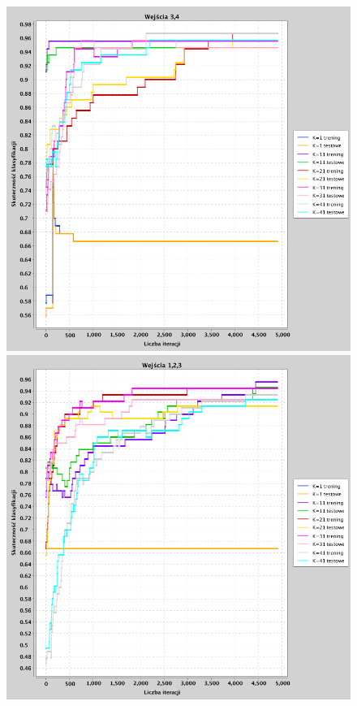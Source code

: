 \documentclass[a4paper, portrait,11pt]{article}
\begin{document}
\begin{figure}[!htb]
  \begin{minipage}{0.33\textwidth}
    \centering
    \includegraphics[width=1\linewidth]{../data/classification4/1/2_3,4.png}
    \caption{\label{fig:41_2_2,3}}
  \end{minipage}
  \begin{minipage}{0.33\textwidth}
    \centering
    \includegraphics[width=1\linewidth]{../data/classification4/1/3_1,2,3.png}

\end{minipage}
\end{figure}
\end{document}
